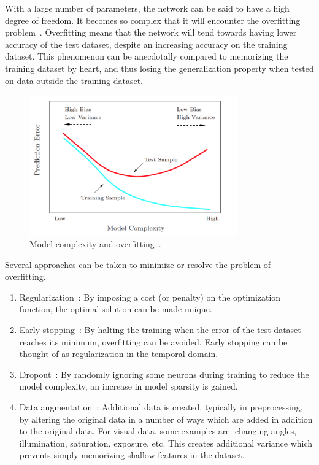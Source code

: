 \documentclass[english, bibtex]{kththesis}
\begin{document}
With a large number of parameters, the network can be said to have a high degree of freedom. It becomes so complex that it will encounter the overfitting problem~\cite{doi:10.1021/ci0342472}. Overfitting means that the network will tend towards having lower accuracy of the test dataset, despite an increasing accuracy on the training dataset. This phenomenon can be anecdotally compared to memorizing the training dataset by heart, and thus losing the generalization property when tested on data outside the training dataset. 

\begin{figure}[H]
  \begin{center}
    \includegraphics[width=0.8\textwidth]{figures/overfitting.png}
  \end{center}
  \caption{Model complexity and overfitting~\cite{Wang_2019}. }
  \label{fig:overfitting}
\end{figure}

Several approaches can be taken to minimize or resolve the problem of overfitting.
\begin{enumerate}
\item Regularization~\cite{10.1038/317314a0}: By imposing a cost (or penalty) on the optimization function, the optimal solution can be made unique.
\item Early stopping~\cite{Prechelt2012}: By halting the training when the error of the test dataset reaches its minimum, overfitting can be avoided. Early stopping can be thought of as regularization in the temporal domain. 
\item Dropout~\cite{JMLR:v15:srivastava14a}: By randomly ignoring some neurons during training to reduce the model complexity, an increase in model sparsity is gained. 
\item Data augmentation~\cite{10.2307/2289457}: Additional data is created, typically in preprocessing, by altering the original data in a number of ways which are added in addition to the original data. For visual data, some examples are: changing angles, illumination, saturation, exposure, etc. This creates additional variance which prevents simply memorizing shallow features in the dataset.
\end{enumerate}
\end{document}
